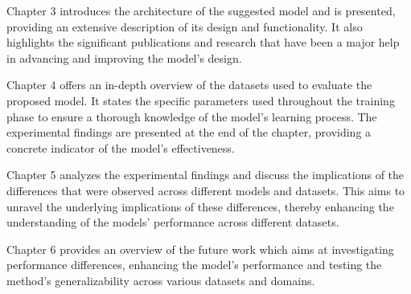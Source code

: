 Chapter 3 introduces the architecture of the suggested model and is presented, providing an extensive description of its design and 
functionality. It also highlights the significant publications and research that have been a major help in advancing and improving the model's design.

Chapter 4 offers an in-depth overview of the datasets used to evaluate the proposed model. It states the specific parameters used throughout the training
phase to ensure a thorough knowledge of the model's learning process. The experimental findings are presented at the end of the chapter, providing a
concrete indicator of the model's effectiveness.


Chapter 5 analyzes the experimental findings and discuss the implications of the differences that were observed across different models and datasets. 
This aims to unravel the underlying implications of these differences, thereby enhancing the understanding of the models’ performance across different 
datasets.


Chapter 6 provides an overview of the future work which aims at investigating performance differences, enhancing the model's performance and 
testing the method’s generalizability across various datasets and domains.







